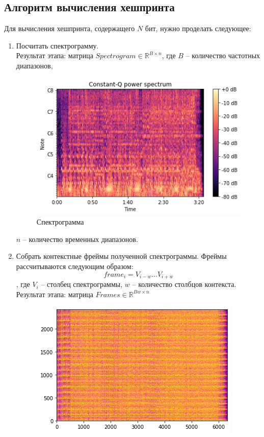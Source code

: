\subsection{Алгоритм вычисления хешпринта}
Для вычисления хешпринта, содержащего $N$ бит, нужно проделать следующее:
\begin{enumerate}[label=\arabic*.]
    \item Посчитать спектрограмму.\\
    Результат этапа: матрица $Spectrogram \in \mathbb{R}^{B \times n}$, где $B$ -- количество частотных диапазонов,
    \begin{figure}[H]
        \begin{center}
            \includegraphics[scale=0.6]{inc/img/spectrogram.png}
            \caption{Спектрограмма}
        \end{center}
    \end{figure}
    $n$ -- количество временных диапазонов.
    \item Собрать контекстные фреймы полученной спектрограммы.
    Фреймы рассчитываются следующим образом:
    $$frame_i = V_{i-w}...V_{i+w}$$, где $V_i$ -- столбец спектрограммы, $w$ -- количество столбцов контекста.\\
    Результат этапа: матрица $Frames \in \mathbb{R}^{Bw \times n}$
    \begin{figure}[H]
        \begin{center}
            \includegraphics[scale=0.6]{inc/img/frame.png}

\end{center}
\end{figure}
\end{enumerate}

